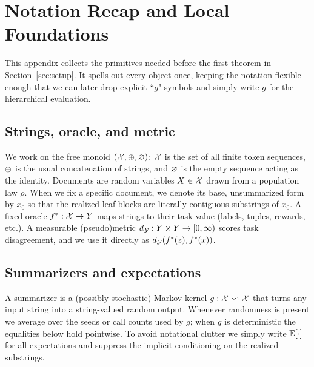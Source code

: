 
\section{Notation Recap and Local Foundations}
\label{app:notation}

This appendix collects the primitives needed before the first theorem in Section~\ref{sec:setup}. It spells out every object once, keeping the notation flexible enough that we can later drop explicit ``$g$" symbols and simply write $g$ for the hierarchical evaluation.

\subsection{Strings, oracle, and metric}
We work on the free monoid $(\mathcal{X},\oplus,\varnothing)$: $\mathcal{X}$ is the set of all finite token sequences, $\oplus$ is the usual concatenation of strings, and $\varnothing$ is the empty sequence acting as the identity. Documents are random variables $X\in\mathcal{X}$ drawn from a population law $\rho$. When we fix a specific document, we denote its base, unsummarized form by $x_0$ so that the realized leaf blocks are literally contiguous substrings of $x_0$. A fixed oracle $f^{\ast}:\mathcal{X}\to Y$ maps strings to their task value (labels, tuples, rewards, etc.). A measurable (pseudo)metric $d_{\mathcal{Y}}:Y\times Y\to[0,\infty)$ scores task disagreement, and we use it directly as $d_{\mathcal{Y}}(f^{\ast}(z),f^{\ast}(x))$.

\subsection{Summarizers and expectations}
A summarizer is a (possibly stochastic) Markov kernel $g:\mathcal{X}\rightsquigarrow\mathcal{X}$ that turns any input string into a string-valued random output. Whenever randomness is present we average over the seeds or call counts used by $g$; when $g$ is deterministic the equalities below hold pointwise. To avoid notational clutter we simply write $\mathbb{E}[\cdot]$ for all expectations and suppress the implicit conditioning on the realized substrings.

